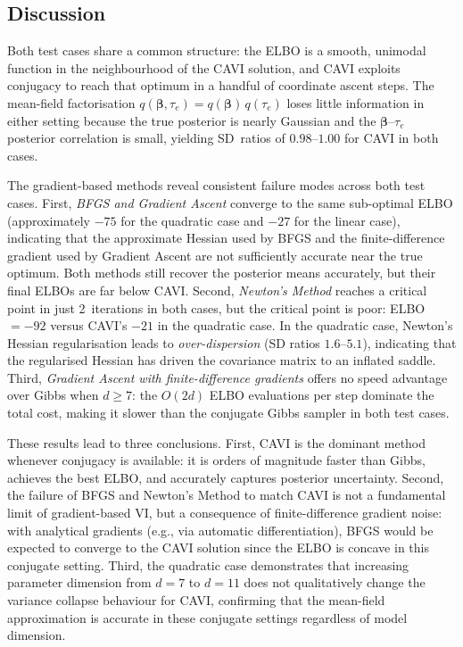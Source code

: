 \documentclass[11pt,a4paper]{article}
\begin{document}
\subsection{Discussion}

Both test cases share a common structure: the ELBO is a smooth, unimodal function in the
neighbourhood of the CAVI solution, and CAVI exploits conjugacy to reach that optimum
in a handful of coordinate ascent steps. The mean-field factorisation
$q(\bm{\beta},\tau_e) = q(\bm{\beta})\,q(\tau_e)$ loses little information in either
setting because the true posterior is nearly Gaussian and the $\bm{\beta}$--$\tau_e$
posterior correlation is small, yielding SD~ratios of $0.98$--$1.00$ for CAVI in both cases.

The gradient-based methods reveal consistent failure modes across both test cases.
First, \emph{BFGS and Gradient Ascent} converge to the same sub-optimal ELBO
(approximately $-75$ for the quadratic case and $-27$ for the linear case),
indicating that the approximate Hessian used by BFGS and the finite-difference gradient
used by Gradient Ascent are not sufficiently accurate near the true optimum.
Both methods still recover the posterior means accurately, but their final ELBOs are far
below CAVI.
Second, \emph{Newton's Method} reaches a critical point in just 2~iterations in both cases,
but the critical point is poor: ELBO $= -92$ versus CAVI's $-21$ in the quadratic case.
In the quadratic case, Newton's Hessian regularisation leads to \emph{over-dispersion}
(SD ratios $1.6$--$5.1$), indicating that the regularised Hessian has driven the
covariance matrix to an inflated saddle.
Third, \emph{Gradient Ascent with finite-difference gradients} offers no speed advantage
over Gibbs when $d \geq 7$: the $O(2d)$ ELBO evaluations per step dominate the total
cost, making it slower than the conjugate Gibbs sampler in both test cases.

These results lead to three conclusions.
First, CAVI is the dominant method whenever conjugacy is available: it is orders of
magnitude faster than Gibbs, achieves the best ELBO, and accurately captures posterior
uncertainty.
Second, the failure of BFGS and Newton's Method to match CAVI is not a fundamental limit
of gradient-based VI, but a consequence of finite-difference gradient noise: with
analytical gradients (e.g., via automatic differentiation), BFGS would be expected to
converge to the CAVI solution since the ELBO is concave in this conjugate setting.
Third, the quadratic case demonstrates that increasing parameter dimension from $d=7$
to $d=11$ does not qualitatively change the variance collapse behaviour for CAVI,
confirming that the mean-field approximation is accurate in these conjugate settings
regardless of model dimension.
\end{document}
